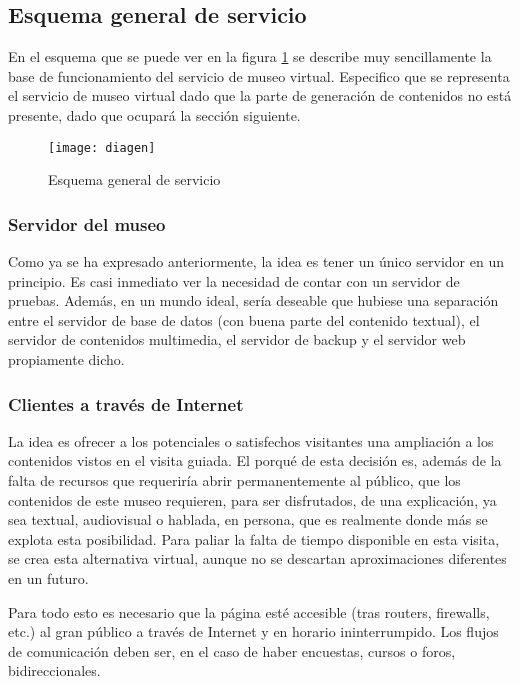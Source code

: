 \subsection{Esquema general de servicio}
\par En el esquema que se puede ver en la figura \ref{fig:diagen} se describe muy sencillamente la base de funcionamiento del servicio de museo virtual. Especifico que se representa el servicio de museo virtual dado que la parte de generación de contenidos no está presente, dado que ocupará la sección siguiente.

  \begin{figure}[t!]
    \begin{narrow}{-1cm}{-1cm}
      \centering
      \texttt{[image: diagen]}
      \caption{Esquema general de servicio}
      \label{fig:diagen}
    \end{narrow}
  \end{figure}

\subsubsection{Servidor del museo}
\par Como ya se ha expresado anteriormente, la idea es tener un único servidor en un principio. Es casi inmediato ver la necesidad de contar con un servidor de pruebas. Además, en un mundo ideal, sería deseable que hubiese una separación entre el servidor de base de datos (con buena parte del contenido textual), el servidor de contenidos multimedia, el servidor de backup y el servidor web propiamente dicho.

\subsubsection{Clientes a través de Internet}
\par La idea es ofrecer a los potenciales o satisfechos visitantes una ampliación a los contenidos vistos en el visita guiada. El porqué de esta decisión es, además de la falta de recursos que requeriría abrir permanentemente al público, que los contenidos de este museo requieren, para ser disfrutados, de una explicación, ya sea textual, audiovisual o hablada, en persona, que es realmente donde más se explota esta posibilidad. Para paliar la falta de tiempo disponible en esta visita, se crea esta alternativa virtual, aunque no se descartan aproximaciones diferentes en un futuro.

\par Para todo esto es necesario que la página esté accesible (tras routers, firewalls, etc.) al gran público a través de Internet y en horario ininterrumpido. Los flujos de comunicación deben ser, en el caso de haber encuestas, cursos o foros, bidireccionales.

